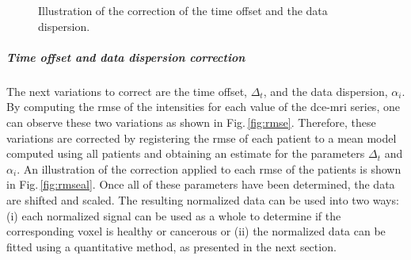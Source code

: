\documentclass[a4paper,num-refs]{wiley-article}
\begin{document}
\begin{figure}
  \centering
  \hspace*{\fill}
   \hfill
  \hspace*{\fill}
  \caption{Illustration of the correction of the time offset and the data
    dispersion.}
  \label{fig:curveal}
\end{figure}

\subparagraph{Time offset and data dispersion correction} The next variations
to correct are the time offset, $\Delta_t$, and the data dispersion,
$\alpha_i$. By computing the \ac{rmse} of the intensities for each value of the
\ac{dce}-\ac{mri} series, one can observe these two variations as shown in
Fig.\,\ref{fig:rmse}. Therefore, these variations are corrected by registering
the \ac{rmse} of each patient to a mean model computed using all patients and
obtaining an estimate for the parameters $\Delta_t$ and $\alpha_i$. An
illustration of the correction applied to each \ac{rmse} of the patients is
shown in Fig.\,\ref{fig:rmseal}. Once all of these parameters have been
determined, the data are shifted and scaled. The resulting normalized data can
be used into two ways: (i) each normalized signal can be used as a whole to
determine if the corresponding voxel is healthy or cancerous or (ii) the
normalized data can be fitted using a quantitative method, as presented in the
next section.
\end{document}
